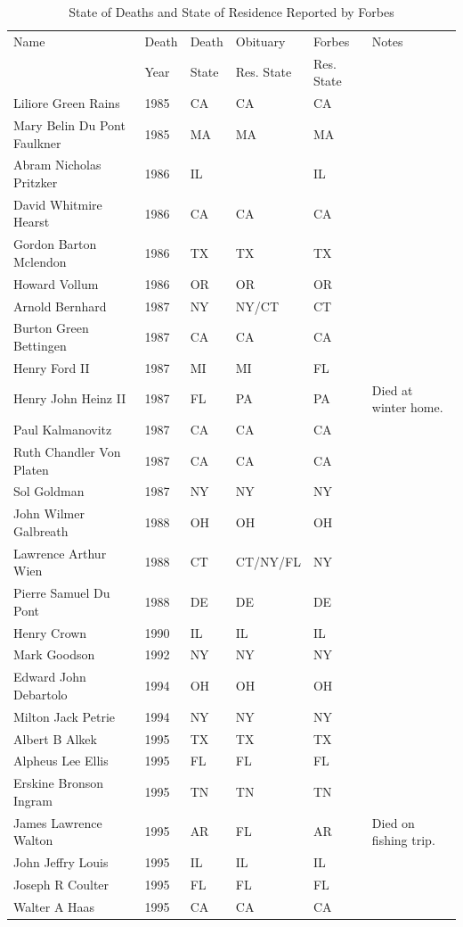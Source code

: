 \documentclass[12pt]{article}
\begin{document}
\tiny{
\begin{longtable}{l l l l l l}
			\caption{State of Deaths and State of Residence Reported by Forbes}\\ 
			\hline 
		Name &Death &Death &Obituary &Forbes &Notes\\ 
		  &Year &State &Res. State &Res. State & \\ [0.5ex]
		\hline
		
		Liliore Green Rains&1985&CA&CA&CA&\\
		Mary Belin Du Pont Faulkner&1985&MA&MA&MA&\\
		Abram Nicholas Pritzker&1986&IL&&IL&\\
		David Whitmire Hearst&1986&CA&CA&CA&\\
		Gordon Barton Mclendon&1986&TX&TX&TX&\\
		Howard Vollum&1986&OR&OR&OR&\\
		Arnold Bernhard&1987&NY&NY/CT&CT&\\
		Burton Green Bettingen&1987&CA&CA&CA&\\
		Henry Ford II&1987&MI&MI&FL&\\
		Henry John Heinz II&1987&FL&PA&PA&Died at winter home.\\
		Paul Kalmanovitz&1987&CA&CA&CA&\\
		Ruth Chandler Von Platen&1987&CA&CA&CA&\\
		Sol Goldman&1987&NY&NY&NY&\\
		John Wilmer Galbreath&1988&OH&OH&OH&\\
		Lawrence Arthur Wien&1988&CT&CT/NY/FL&NY&\\
		Pierre Samuel Du Pont&1988&DE&DE&DE&\\
		Henry Crown&1990&IL&IL &IL&\\
		Mark Goodson&1992&NY&NY&NY&\\
		Edward John Debartolo&1994&OH&OH&OH&\\
		Milton Jack Petrie&1994&NY&NY&NY&\\
		Albert B Alkek&1995&TX&TX&TX&\\
		Alpheus Lee Ellis&1995&FL&FL&FL&\\
		Erskine Bronson Ingram&1995&TN&TN&TN&\\
		James Lawrence Walton&1995&AR&FL&AR&Died on fishing trip.\\
		John Jeffry Louis&1995&IL&IL&IL&\\
		Joseph R Coulter&1995&FL&FL&FL&\\
		Walter A Haas&1995& CA&CA&CA&\\

\end{longtable}}
\end{document}
